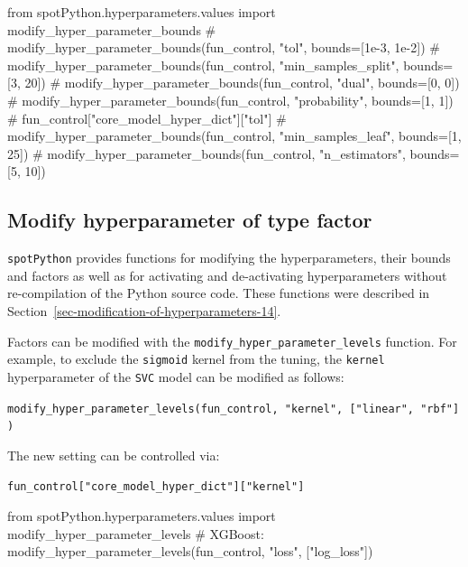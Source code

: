 \documentclass[
  letterpaper,
  DIV=11,
  numbers=noendperiod]{scrreprt}
\newenvironment{Shaded}{\begin{snugshade}}{\end{snugshade}}
\newcommand{\CommentTok}[1]{\textcolor[rgb]{0.37,0.37,0.37}{#1}}
\newcommand{\ImportTok}[1]{\textcolor[rgb]{0.00,0.46,0.62}{#1}}
\newcommand{\NormalTok}[1]{\textcolor[rgb]{0.00,0.23,0.31}{#1}}
\newcommand{\StringTok}[1]{\textcolor[rgb]{0.13,0.47,0.30}{#1}}
\begin{document}
\begin{Shaded}
\begin{Highlighting}[]
\ImportTok{from}\NormalTok{ spotPython.hyperparameters.values }\ImportTok{import}\NormalTok{ modify\_hyper\_parameter\_bounds}
\CommentTok{\# modify\_hyper\_parameter\_bounds(fun\_control, "tol", bounds=[1e{-}3, 1e{-}2])}
\CommentTok{\# modify\_hyper\_parameter\_bounds(fun\_control, "min\_samples\_split", bounds=[3, 20])}
\CommentTok{\# modify\_hyper\_parameter\_bounds(fun\_control, "dual", bounds=[0, 0])}
\CommentTok{\# modify\_hyper\_parameter\_bounds(fun\_control, "probability", bounds=[1, 1])}
\CommentTok{\# fun\_control["core\_model\_hyper\_dict"]["tol"]}
\CommentTok{\# modify\_hyper\_parameter\_bounds(fun\_control, "min\_samples\_leaf", bounds=[1, 25])}
\CommentTok{\# modify\_hyper\_parameter\_bounds(fun\_control, "n\_estimators", bounds=[5, 10])}
\end{Highlighting}
\end{Shaded}

\hypertarget{modify-hyperparameter-of-type-factor-3}{%
\subsection{Modify hyperparameter of type
factor}\label{modify-hyperparameter-of-type-factor-3}}

\texttt{spotPython} provides functions for modifying the
hyperparameters, their bounds and factors as well as for activating and
de-activating hyperparameters without re-compilation of the Python
source code. These functions were described in
Section~\ref{sec-modification-of-hyperparameters-14}.

Factors can be modified with the
\texttt{modify\_hyper\_parameter\_levels} function. For example, to
exclude the \texttt{sigmoid} kernel from the tuning, the \texttt{kernel}
hyperparameter of the \texttt{SVC} model can be modified as follows:

\texttt{modify\_hyper\_parameter\_levels(fun\_control,\ "kernel",\ {[}"linear",\ "rbf"{]})}

The new setting can be controlled via:

\texttt{fun\_control{[}"core\_model\_hyper\_dict"{]}{[}"kernel"{]}}

\begin{Shaded}
\begin{Highlighting}[]
\ImportTok{from}\NormalTok{ spotPython.hyperparameters.values }\ImportTok{import}\NormalTok{ modify\_hyper\_parameter\_levels}
\CommentTok{\# XGBoost:}
\NormalTok{modify\_hyper\_parameter\_levels(fun\_control, }\StringTok{"loss"}\NormalTok{, [}\StringTok{"log\_loss"}\NormalTok{])}
\end{Highlighting}
\end{Shaded}
\end{document}

